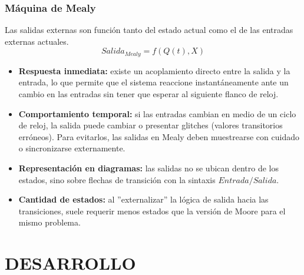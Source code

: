 \subsubsection{Máquina de Mealy}
\sangria{} Las salidas externas son función tanto del estado actual como el de las entradas externas actuales.
{\Large 
\[
	Salida_{Mealy} = f(Q(t), X)
\] 
}

\begin{itemize}[nosep]
	\item\textbf{Respuesta inmediata:} existe un acoplamiento directo entre la salida y la entrada, lo que permite que el sistema reaccione instantáneamente ante un cambio en las entradas sin tener que esperar al siguiente flanco de reloj.
	\item\textbf{Comportamiento temporal:} si las entradas cambian en medio de un ciclo de reloj, la salida puede cambiar o presentar glitches (valores transitorios erróneos). Para evitarlos, las salidas en Mealy deben muestrearse con cuidado o sincronizarse externamente.
	\item\textbf{Representación en diagramas:} las salidas no se ubican dentro de los estados, sino sobre flechas de transición con la sintaxis $Entrada/Salida$.
	\item\textbf{Cantidad de estados:} al ''externalizar'' la lógica de salida hacia las transiciones, suele requerir menos estados que la versión de Moore para el mismo problema.
\end{itemize}

\section{DESARROLLO}
\usetikzlibrary{shapes.geometric, arrows.meta, positioning}

